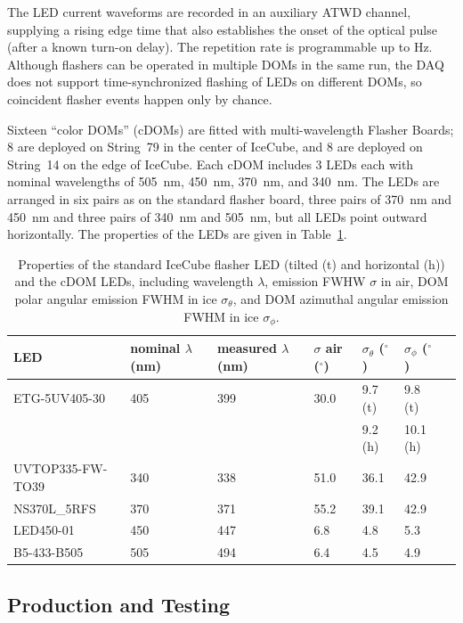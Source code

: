The LED current waveforms are recorded in an auxiliary ATWD channel, supplying
a rising edge time that also establishes the onset of the optical pulse (after a known
turn-on delay).
The repetition rate is programmable up to \unit[610]{Hz}.
Although flashers can be
operated in multiple DOMs in the same run, the DAQ does not support
time-synchronized flashing of LEDs on different DOMs, so coincident flasher
events happen only by chance. 

Sixteen ``color DOMs'' (cDOMs) are fitted with multi-wavelength
Flasher Boards; 8 are deployed on String~79 in the center of IceCube, and 8
are deployed on String~14 on the edge of IceCube.  Each cDOM includes
3 LEDs each with nominal
wavelengths of 505~nm, 450~nm, 370~nm, and 340~nm. The LEDs are
arranged in six pairs as on the
standard flasher board, three pairs of 370~nm and 450~nm and three
pairs of 340~nm and 505~nm, but all LEDs point outward horizontally. 
The properties of the LEDs are given in
Table~\ref{table:cdom_properties}.

\begin{table}
\caption{Properties of the standard IceCube flasher LED (tilted (t)
  and horizontal (h)) and the cDOM LEDs, including wavelength $\lambda$,
  emission FWHW $\sigma$ in air, DOM polar
  angular emission FWHM in ice $\sigma_{\theta}$, and DOM azimuthal angular emission
  FWHM in ice $\sigma_{\phi}$.}
\begin{tabularx}{\linewidth}{lXXXXXX}
\toprule
 LED& nominal $\lambda$ (nm) & measured $\lambda$ (nm) & $\sigma$ air ($^{\circ}$) &
 $\sigma_{\theta}$ ($^{\circ}$) & $\sigma_{\phi}$ ($^{\circ}$)\\
\midrule
ETG-5UV405-30 & 405 & 399 & 30.0 & 9.7 (t)& 9.8 (t) \\
 &  &  &  & 9.2 (h)& 10.1 (h)\\
UVTOP335-FW-TO39 & 340 & 338 & 51.0 & 36.1 & 42.9 \\
NS370L\_5RFS & 370 & 371 & 55.2 & 39.1 & 42.9 \\
LED450-01 & 450 & 447 &	6.8 & 4.8 &	5.3 \\
B5-433-B505 & 505 & 494 & 6.4 &	4.5 & 4.9 \\
\bottomrule
\end{tabularx}
\label{table:cdom_properties}
\end{table}

\subsection{\label{sec:dom_prodtest}Production and Testing}

